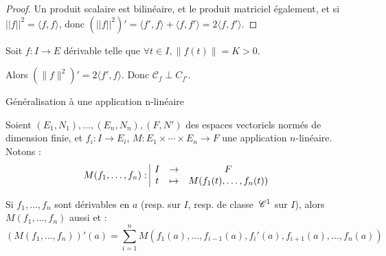 
\begin{proof}
    Un produit scalaire est bilinéaire, et le produit matriciel également, et si 
    $||f||^2 = \langle f, f \rangle$, donc $(||f||^2)' = \langle f', f \rangle + \langle f, f' \rangle = 2 \langle f, f' \rangle$.
\end{proof}

\begin{exemple}
Soit $f: I \to E$ dérivable telle que $\forall t \in I, \|f(t)\| = K > 0$.

Alors $(\|f\|^2)' = 2 \langle f',f \rangle$. Donc $\mathscr C_f \perp C_{f'}$.
\end{exemple}

\begin{figure}[htbp]
\centering
{}
\end{figure}

\begin{theoreme}{Généralisation à une application n-linéaire}{}

    Soient $(E_1, N_1), \ldots, (E_n, N_n), (F, N')$ des espaces vectoriels normés de dimension finie, et
    $f_i : I \to E_i$, $M : E_1 \times \cdots \times E_n \to F$ une application $n$-linéaire.
    Notons :
    \[M(f_1, \ldots, f_n): \space \begin{array}{|ccc} \displaystyle I & \to & \displaystyle F \\ \displaystyle t & \mapsto & \displaystyle M(f_1(t), \ldots, f_n(t)) \end{array}\]

    \avspace Si $f_1, \ldots, f_n$ sont dérivables en $a$ (resp. sur $I$, resp. de classe $\,\mathscr C^{1}$ sur $I$),
    alors $M(f_1, \ldots, f_n)$ aussi et :
    \[(M(f_1, \ldots, f_n))'(a) = \sum_{i=1}^n M(f_1(a), \ldots, f_{i-1}(a), f_i'(a), f_{i+1}(a), \ldots, f_n(a))\]
\end{theoreme}

